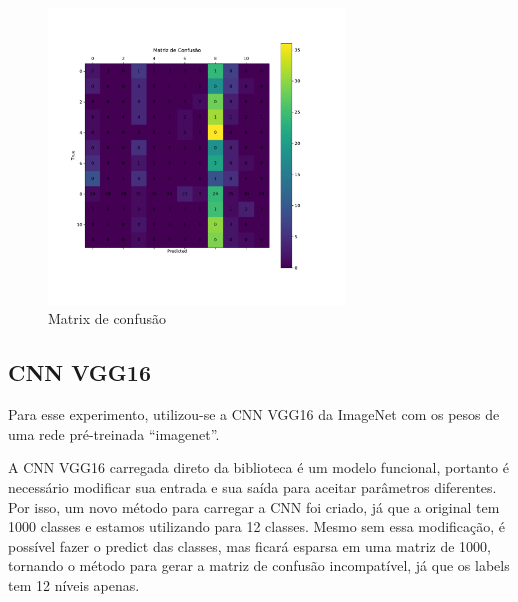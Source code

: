\documentclass[12pt,
	english,			%
	french,				%
	spanish,			%
	brazil,				%
	]{article}
\begin{document}
\begin{figure}[!htb]
\centering
\includegraphics[width=0.7\textwidth]{images/cm_inception_v4.pdf}
\caption{\label{fig:grafico01}Matrix de confusão}
\end{figure}

\subsection{CNN VGG16}

Para esse experimento, utilizou-se a CNN VGG16 da ImageNet com os pesos de uma rede pré-treinada ``imagenet''.

A CNN VGG16 carregada direto da biblioteca é um modelo funcional, portanto é necessário modificar sua entrada e sua saída para aceitar parâmetros diferentes. Por isso, um novo método para carregar a CNN foi criado, já que a original tem 1000 classes e estamos utilizando para 12 classes. Mesmo sem essa modificação, é possível fazer o predict das classes, mas ficará esparsa em uma matriz de 1000, tornando o método para gerar a matriz de confusão incompatível, já que os labels tem 12 níveis apenas.
\end{document}
